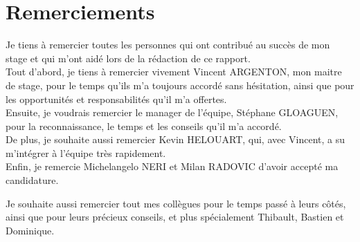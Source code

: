\chapter*{Remerciements} %

Je tiens à remercier toutes les personnes qui ont contribué au succès de mon stage et qui m'ont aidé lors de la rédaction de ce rapport.  \\

Tout d'abord, je tiens à remercier vivement Vincent ARGENTON, mon maitre de stage, pour le temps qu'ils m'a toujours accordé sans hésitation, ainsi que pour les opportunités et responsabilités qu'il m'a offertes. \\

	Ensuite, je voudrais remercier le manager de l'équipe, Stéphane GLOAGUEN, pour la reconnaissance, le temps et les conseils qu'il m'a accordé. \\
	
	De plus, je souhaite aussi remercier Kevin HELOUART, qui, avec Vincent, a su m'intégrer à l'équipe très rapidement.  \\

Enfin, je remercie Michelangelo NERI et Milan RADOVIC d'avoir accepté ma candidature.

Je souhaite aussi remercier tout mes collègues pour le temps passé à leurs côtés, ainsi que pour leurs précieux conseils, et plus spécialement Thibault, Bastien et Dominique.
